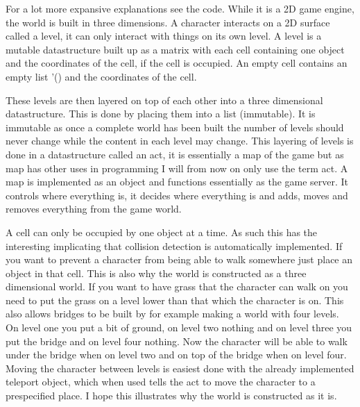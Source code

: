 \documentclass[12pt,a4paper]{article}
\begin{document}
For a lot more expansive explanations see the code.
While it is a 2D game engine, the world is built in three dimensions.
A character interacts on a 2D surface called a level, it can only interact with things on its own level.
A level is a mutable datastructure built up as a matrix with each cell containing one object and the coordinates of the cell, if the cell is occupied. An empty cell contains an empty list '() and the coordinates of the cell. 


These levels are then layered on top of each other into a three dimensional datastructure. This is done by placing them into a list (immutable). It is immutable as once a complete world has been built the number of levels should never change while the content in each level may change.
This layering of levels is done in a datastructure called an act, it is essentially a map of the game but as map has other uses in programming I will from now on only use the term act. A map is implemented as an object and functions essentially as the game server. It controls where everything is, it decides where everything is and adds, moves and removes everything from the game world.


A cell can only be occupied by one object at a time. As such this has the interesting implicating that collision detection is automatically implemented. If you want to prevent a character from being able to walk somewhere just place an object in that cell. This is also why the world is constructed as a three dimensional world. If you want to have grass that the character can walk on you need to put the grass on a level lower than that which the character is on. This also allows bridges to be built by for example making a world with four levels. On level one you put a bit of ground, on level two nothing and on level three you put the bridge and on level four nothing.
Now the character will be able to walk under the bridge when on level two and on top of the bridge when on level four. Moving the character between levels is easiest done with the already implemented teleport object, which when used tells the act to move the character to a prespecified place.
I hope this illustrates why the world is constructed as it is.
\end{document}
